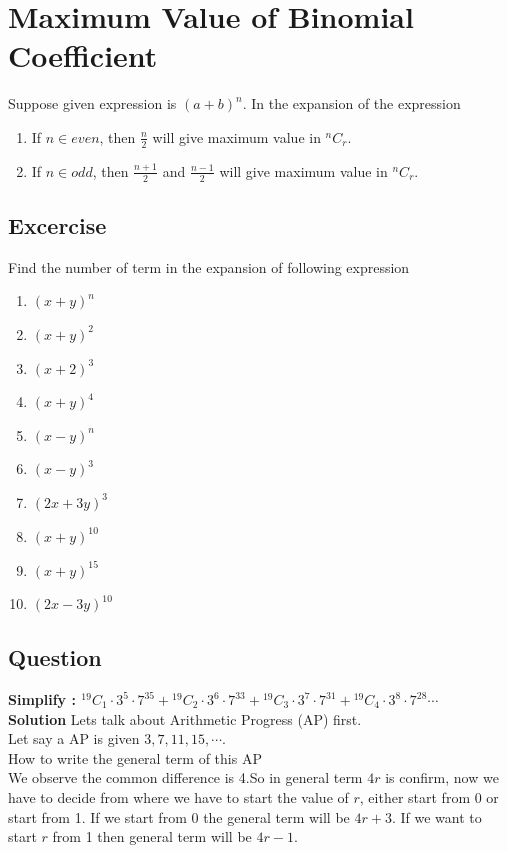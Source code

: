 \documentclass[12pt]{article}
\begin{document}
\section*{Maximum Value of Binomial Coefficient}
Suppose given expression is $(a+b)^n$. In the expansion of the expression
\begin{enumerate}
    \item If $n \in even$, then $\frac{n}{2}$ will give maximum value in ${}^{n}C_{r}$.
    \item If $n \in odd$, then $\frac{n+1}{2}$ and $\frac{n-1}{2}$ will give maximum value in ${}^{n}C_{r}$.
\end{enumerate}
\newpage
\subsection*{Excercise}
Find the number of term in the expansion of following expression
\begin{enumerate}
    \item $(x+y)^{n}$
    \item $(x+y)^{2}$
    \item $(x+2)^{3}$
    \item $(x+y)^{4}$
    \item $(x-y)^{n}$
    \item $(x-y)^{3}$
    \item $(2x+3y)^{3}$
    \item $(x+y)^{10}$
    \item $(x+y)^{15}$
    \item $(2x-3y)^{10}$
\end{enumerate}
\subsection*{Question}
\textbf{Simplify : ${}^{19}C_{1}\cdot3^{5}\cdot7^{35}+{}^{19}C_{2}\cdot3^{6}\cdot7^{33}+{}^{19}C_{3}\cdot3^{7}\cdot7^{31}+{}^{19}C_{4}\cdot3^{8}\cdot7^{28}\cdots$}
\\
\textbf{Solution}
Lets talk about Arithmetic Progress (AP) first.\\
Let say a AP is given $3,7,11,15,\cdots$.\\How to write the general term of this AP \\
We observe the common difference is 4.So in general term $4r$ is confirm, now we have to decide from where we have to start the value of $r$, either start from 0 or start from 1. If we start from $0$ the general term will be $4r+3$. If we want to start $r$ from 1 then general term will be $4r-1$. \\
\end{document}
